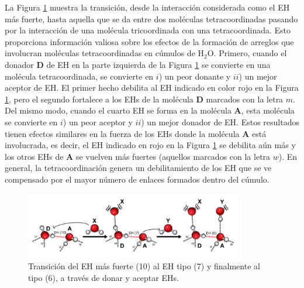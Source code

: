 La Figura \ref{transicion_} muestra la transición, desde la interacción
considerada como el EH más fuerte, hasta aquella que se da entre dos moléculas
tetracoordinadas pasando por la interacción de una molécula tricoordinada con
una tetracoordinada. Esto proporciona información valiosa sobre los efectos de
la formación de arreglos que involucran  moléculas tetracoordinadas en cúmulos
de H$_2$O. Primero, cuando el donador \textbf{D} de EH en la parte izquierda de
la Figura \ref{transicion_} se convierte en una molécula tetracoordinada, se
convierte en $i$) un peor donante y $ii$) un mejor aceptor de EH. El primer
hecho debilita al EH indicado en color rojo en la Figura \ref{transicion_},
pero el segundo fortalece a los EHs de la molécula \textbf{D} marcados con la
letra $m$. Del mismo modo, cuando el cuarto EH se forma en la molécula
$\mathbf{A}$, esta molécula se convierte en $i$) un peor aceptor y $ii$) un
mejor donador de EH. Estos resultados tienen efectos similares en la fuerza de
los EHs donde la molécula $\mathbf{A}$ está involucrada, es decir, el EH
indicado en rojo en la Figura \ref{transicion_} se debilita aún más y los otros
EHs de $\mathbf{A}$ se vuelven más fuertes (aquellos marcados con la letra
$w$).  En general, la tetracoordinación genera un debilitamiento de los EH que
se ve compensado por el mayor número de enlaces formados dentro del cúmulo.
%
\begin{figure}%
    \centering
    \includegraphics[width=0.86\textwidth]{4/img/figura7}
    \caption{Transición del EH más fuerte (10) al EH tipo (7) y finalmente al tipo (6), a través de donar y aceptar EHs.}
\label{transicion_}
\end{figure}
